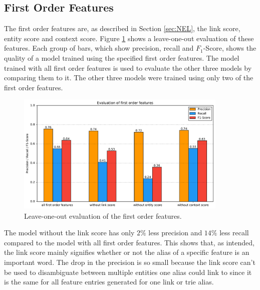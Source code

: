 \subsection{First Order Features}
The first order features are, as described in Section \ref{sec:NEL}, the link score, entity score and context score. Figure \ref{fo_eval} shows a leave-one-out evaluation of these features. Each group of bars, which show precision, recall and $F_1$-Score, shows the quality of a model trained using the specified first order features. The model trained with all first order features is used to evaluate the other three models by comparing them to it. The other three models were trained using only two of the first order features.\par
\begin{figure}[H]
	\centering
	\includegraphics[width=0.9\textwidth]{img/first_order_eval}
	\caption{Leave-one-out evaluation of the first order features.}
	\label{fo_eval}
\end{figure}
The model without the link score has only $2\%$ less precision and $14\%$ less recall compared to the model with all first order features. This shows that, as intended, the link score mainly signifies whether or not the alias of a specific feature is an important word. The drop in the precision is so small because the link score can't be used to disambiguate between multiple entities one alias could link to since it is the same for all feature entries generated for one link or trie alias.\par
